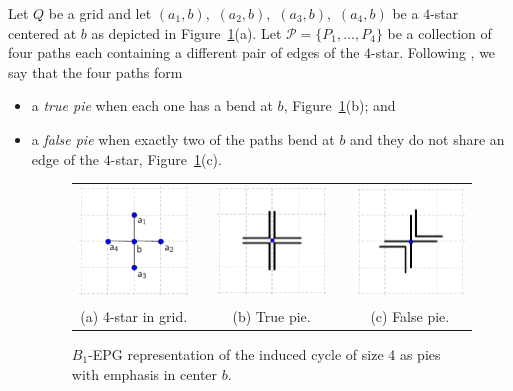 \documentclass{dmgt}
\begin{document}
Let $ Q $ be a grid and let $ (a_1, b),$ $(a_2, b),$ $(a_3, b),$ $(a_4, b)$ be a $4$-star centered at $b$ as depicted in Figure~\ref{fig:piesInGrid}(a). Let $ \mathcal{P} = \{P_1, \dots , P_4\}$ be a collection of four paths each containing a different pair of edges of the $4$-star.
Following \cite{golumbic2009}, we say that the four paths form
\begin{itemize}
\item a \emph{true pie} %
when each one has a bend at $b$, Figure~\ref{fig:piesInGrid}(b); and 
\item a \emph {false pie} when exactly two of the paths %
bend at $b$ and they do not share an edge of the $4$-star, Figure~\ref{fig:piesInGrid}(c). %

%
\begin{figure}[htb]
  \centering
  \begin{tabular}{c c c c c }
    \includegraphics[width=3.5cm]{disposicaoTortaGrid3.pdf}    
    & &\includegraphics[width=3.5cm]{truePieGrid} 
    & &
 \includegraphics[width=3.5cm]{falsePieGrid} \\%
    {\footnotesize (a) 4-star in grid.}  & &  {\footnotesize (b) True pie.} & & {\footnotesize (c) False pie.} %
  \end{tabular}
  \caption{$B_{1}$-EPG representation of the induced cycle of size 4 as pies with emphasis in center $b$.}\label{fig:piesInGrid}
\end{figure} 


\end{itemize}
\end{document}
